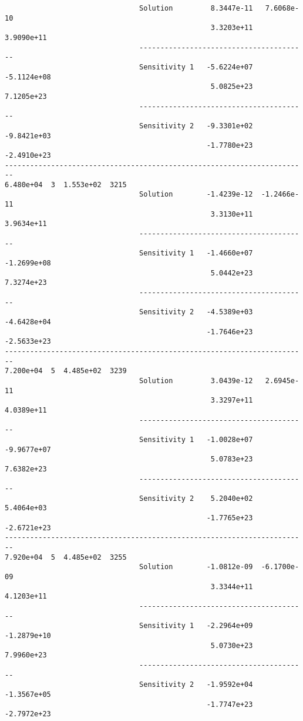 \begin{verbatim}
                                Solution         8.3447e-11   7.6068e-10 
                                                 3.3203e+11   3.9090e+11 
                                ----------------------------------------
                                Sensitivity 1   -5.6224e+07  -5.1124e+08 
                                                 5.0825e+23   7.1205e+23 
                                ----------------------------------------
                                Sensitivity 2   -9.3301e+02  -9.8421e+03 
                                                -1.7780e+23  -2.4910e+23 
------------------------------------------------------------------------
6.480e+04  3  1.553e+02  3215
                                Solution        -1.4239e-12  -1.2466e-11 
                                                 3.3130e+11   3.9634e+11 
                                ----------------------------------------
                                Sensitivity 1   -1.4660e+07  -1.2699e+08 
                                                 5.0442e+23   7.3274e+23 
                                ----------------------------------------
                                Sensitivity 2   -4.5389e+03  -4.6428e+04 
                                                -1.7646e+23  -2.5633e+23 
------------------------------------------------------------------------
7.200e+04  5  4.485e+02  3239
                                Solution         3.0439e-12   2.6945e-11 
                                                 3.3297e+11   4.0389e+11 
                                ----------------------------------------
                                Sensitivity 1   -1.0028e+07  -9.9677e+07 
                                                 5.0783e+23   7.6382e+23 
                                ----------------------------------------
                                Sensitivity 2    5.2040e+02   5.4064e+03 
                                                -1.7765e+23  -2.6721e+23 
------------------------------------------------------------------------
7.920e+04  5  4.485e+02  3255
                                Solution        -1.0812e-09  -6.1700e-09 
                                                 3.3344e+11   4.1203e+11 
                                ----------------------------------------
                                Sensitivity 1   -2.2964e+09  -1.2879e+10 
                                                 5.0730e+23   7.9960e+23 
                                ----------------------------------------
                                Sensitivity 2   -1.9592e+04  -1.3567e+05 
                                                -1.7747e+23  -2.7972e+23 

\end{verbatim}
